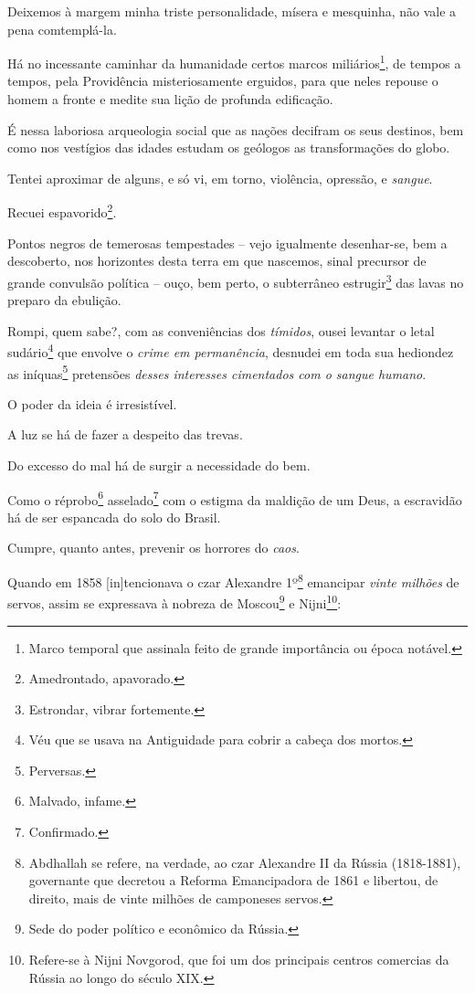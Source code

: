 Deixemos à margem minha triste personalidade, mísera e mesquinha, não
vale a pena comtemplá-la.

Há no incessante caminhar da humanidade certos marcos
miliários\footnote{Marco temporal que assinala feito de grande
  importância ou época notável.}, de tempos a tempos, pela Providência
misteriosamente erguidos, para que neles repouse o homem a fronte e
medite sua lição de profunda edificação.

É nessa laboriosa arqueologia social que as nações decifram os seus
destinos, bem como nos vestígios das idades estudam os geólogos as
transformações do globo.

Tentei aproximar de alguns, e só vi, em torno, violência, opressão, e
\emph{sangue}.

Recuei espavorido\footnote{Amedrontado, apavorado.}.

Pontos negros de temerosas tempestades -- vejo igualmente desenhar-se,
bem a descoberto, nos horizontes desta terra em que nascemos, sinal
precursor de grande convulsão política -- ouço, bem perto, o subterrâneo
estrugir\footnote{Estrondar, vibrar fortemente.} das lavas no preparo
da ebulição.

Rompi, quem sabe?, com as conveniências dos \emph{tímidos}, ousei
levantar o letal sudário\footnote{Véu que se usava na Antiguidade para
  cobrir a cabeça dos mortos.} que envolve o \emph{crime em
permanência}, desnudei em toda sua hediondez as iníquas\footnote{
  Perversas.} pretensões \emph{desses interesses cimentados com o sangue
humano}.

O poder da ideia é irresistível.

A luz se há de fazer a despeito das trevas.

Do excesso do mal há de surgir a necessidade do bem.

Como o réprobo\footnote{Malvado, infame.} asselado\footnote{
  Confirmado.} com o estigma da maldição de um Deus, a escravidão há de
ser espancada do solo do Brasil.

Cumpre, quanto antes, prevenir os horrores do \emph{caos}.

Quando em 1858 {[}in{]}tencionava o czar Alexandre 1º\footnote{
  Abdhallah se refere, na verdade, ao czar Alexandre II da Rússia
  (1818-1881), governante que decretou a Reforma Emancipadora de 1861 e
  libertou, de direito, mais de vinte milhões de camponeses servos.}
emancipar \emph{vinte milhões} de servos, assim se expressava à nobreza
de Moscou\footnote{Sede do poder político e econômico da Rússia.} e
Nijni\footnote{Refere-se à Nijni Novgorod, que foi um dos principais
  centros comercias da Rússia ao longo do século XIX.}:

